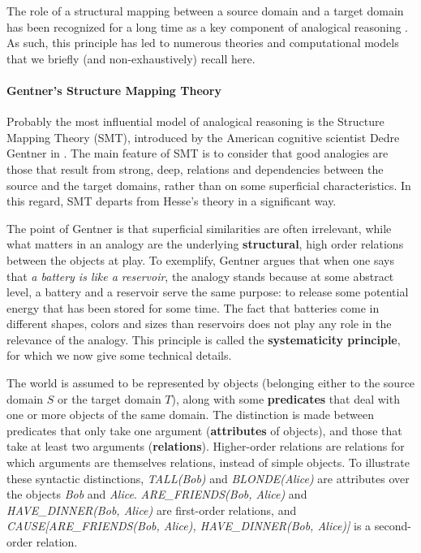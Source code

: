 The role of a structural mapping between a source domain and a target domain
has been recognized for a long time as a key component of analogical reasoning
. As such, this principle has led to numerous theories
and computational models that we briefly (and non-exhaustively) recall here.

\paragraph{Gentner's Structure Mapping Theory\\}

Probably the most influential model of analogical reasoning is the Structure
Mapping Theory (SMT), introduced by the American cognitive scientist Dedre
Gentner in \cite{Gen83}. The main feature of SMT is to consider that good
analogies are those that result from strong, deep, relations and dependencies
between the source and the target domains, rather than on some superficial
characteristics. In this regard, SMT departs from Hesse's theory in a
significant way. 

The point of Gentner is that superficial similarities are often irrelevant,
while what matters in an analogy are the underlying \textbf{structural}, high
order relations between the objects at play. To exemplify, Gentner argues that
when one says that \textit{a battery is like a reservoir}, the analogy stands
because at some abstract level, a battery and a reservoir serve the same
purpose: to release some potential energy that has been stored for some time.
The fact that batteries come in different shapes, colors and sizes than
reservoirs does not play any role in the relevance of the analogy. This
principle is called the \textbf{systematicity principle}, for which we now give
some technical details.

The world is assumed to be represented by objects (belonging either to the
source domain $S$ or the target domain $T$), along with some
\textbf{predicates} that deal with one or more objects of the same domain. The
distinction is made between predicates that only take one argument
(\textbf{attributes} of objects), and those  that take at least two arguments 
(\textbf{relations}). Higher-order relations are relations for which arguments
are themselves relations, instead of simple objects. To illustrate these
syntactic distinctions, \textit{TALL(Bob)} and \textit{BLONDE(Alice)} are
attributes over the objects \textit{Bob} and \textit{Alice}.
\textit{ARE\_FRIENDS(Bob, Alice)} and \textit{HAVE\_DINNER(Bob, Alice)} are
first-order relations, and \textit{CAUSE[ARE\_FRIENDS(Bob, Alice),
HAVE\_DINNER(Bob, Alice)]} is a second-order relation.

